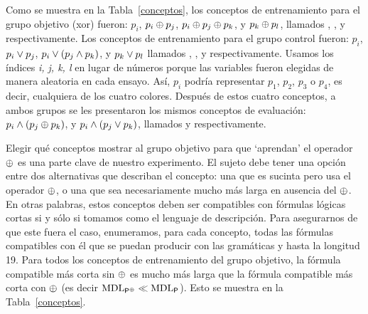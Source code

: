Como se muestra en la Tabla~\ref{conceptos}, los conceptos de entrenamiento para el grupo objetivo (xor) fueron: $p_{i}$, $p_{i} \oplus p_{j}$, $p_{i} \oplus p_{j} \oplus p_{k}$, y $p_{k} \oplus p_{l}$, llamados \targeta, \targetb, \targetc y \targetd respectivamente. Los conceptos de entrenamiento para el grupo control fueron: $p_{i}$, $p_{i} \vee p_{j}$, $p_{i} \vee (p_{j} \wedge p_{k})$, y $p_{k} \vee p_{l}$ llamados \controla, \controlb, \controlc y \controld respectivamente. Usamos los índices \textit{i, j, k, l} en lugar de números porque las variables fueron elegidas de manera aleatoria en cada ensayo. Así, $p_{i}$ podría representar $p_1$, $p_2$, $p_3$ o $p_4$, es decir, cualquiera de los cuatro colores. Después de estos cuatro conceptos, a ambos grupos se les presentaron los mismos conceptos de evaluación: $p_{i} \wedge (p_{j} \oplus p_{k})$, y $p_{i} \wedge (p_{j} \vee p_{k})$, llamados \testa y \testb respectivamente.


Elegir qué conceptos mostrar al grupo objetivo para que `aprendan' el operador $\oplus$ es una parte clave de nuestro experimento. El sujeto debe tener una opción entre dos alternativas que describan el concepto: una que es sucinta pero usa el operador $\oplus$, o una que sea necesariamente mucho más larga en ausencia del $\oplus$. En otras palabras, estos conceptos deben ser compatibles con fórmulas lógicas cortas si y sólo si tomamos \gramboolxor como el lenguaje de descripción. Para asegurarnos de que este fuera el caso, enumeramos, para cada concepto, todas las fórmulas compatibles con él que se puedan producir con las gramáticas \grambool y \gramboolxor hasta la longitud 19. Para todos los conceptos de entrenamiento del grupo objetivo, la fórmula compatible más corta sin $\oplus$ es mucho más larga que la fórmula compatible más corta con $\oplus$ (es decir ${\rm MDL}_{{\sf P}^\oplus}\ll{\rm MDL}_{{\sf P}}$). Esto se muestra en la Tabla~\ref{conceptos}.

